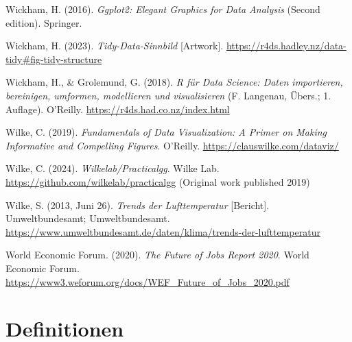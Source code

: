 \documentclass[
  letterpaper,
  twoside,
  open=any]{scrbook}
\newlength{\cslhangindent}
\newenvironment{CSLReferences}[2] %
 {\begin{list}{}{%
  \setlength{\itemindent}{0pt}
  \setlength{\leftmargin}{0pt}
  \setlength{\parsep}{0pt}
  \ifodd #1
   \setlength{\leftmargin}{\cslhangindent}
   \setlength{\itemindent}{-1\cslhangindent}
  \fi
  \setlength{\itemsep}{#2\baselineskip}}}
 {\end{list}}
\theoremstyle{definition}
\theoremstyle{definition}
\theoremstyle{definition}
\theoremstyle{remark}
\begin{document}
\begin{CSLReferences}{1}{0}
Wickham, H. (2016). \emph{Ggplot2: Elegant Graphics for Data Analysis}
(Second edition). Springer.

Wickham, H. (2023). \emph{Tidy-{Data-Sinnbild}} {[}Artwork{]}.
\url{https://r4ds.hadley.nz/data-tidy\#fig-tidy-structure}

Wickham, H., \& Grolemund, G. (2018). \emph{R für Data Science: Daten
importieren, bereinigen, umformen, modellieren und visualisieren} (F.
Langenau, Übers.; 1. Auflage). O'Reilly.
\url{https://r4ds.had.co.nz/index.html}

Wilke, C. (2019). \emph{Fundamentals of Data Visualization: A Primer on
Making Informative and Compelling Figures}. O'Reilly.
\url{https://clauswilke.com/dataviz/}

Wilke, C. (2024). \emph{Wilkelab/Practicalgg}. Wilke Lab.
\url{https://github.com/wilkelab/practicalgg} (Original work published
2019)

Wilke, S. (2013, Juni 26). \emph{Trends der Lufttemperatur}
{[}Bericht{]}. Umweltbundesamt; Umweltbundesamt.
\url{https://www.umweltbundesamt.de/daten/klima/trends-der-lufttemperatur}

World Economic Forum. (2020). \emph{The {Future} of {Jobs Report} 2020}.
World Economic Forum.
\url{https://www3.weforum.org/docs/WEF_Future_of_Jobs_2020.pdf}

\end{CSLReferences}

\cleardoublepage
{}
{}
\appendix

\chapter{Definitionen}\label{definitionen}
\end{document}
